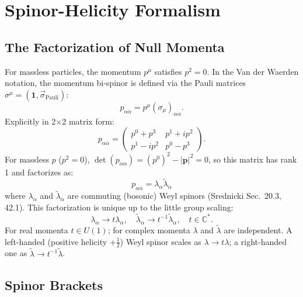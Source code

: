 
\chapter{Spinor-Helicity Formalism}
\label{ch:spinor-helicity}

\section{The Factorization of Null Momenta}

For massless particles, the momentum $p^\mu$ satisfies $p^2 = 0$. In the Van der Waerden notation, the momentum bi-spinor is defined via the Pauli matrices $\sigma^\mu = (\mathbf{1}, \vec{\sigma}_\text{Pauli})$:
\begin{equation}
p_{\alpha\dot{\alpha}} = p^\mu (\sigma_\mu)_{\alpha\dot{\alpha}}.
\end{equation}
Explicitly in 2×2 matrix form:
\begin{equation}
p_{\alpha\dot{\alpha}} = \begin{pmatrix} p^0 + p^3 & p^1 + i p^2 \\ p^1 - i p^2 & p^0 - p^3 \end{pmatrix}.
\end{equation}
For massless $p$ ($p^2 = 0$), $\det(p_{\alpha\dot\alpha}) = (p^0)^2 - |\mathbf{p}|^2 = 0$, so this matrix has rank 1 and factorizes as:
\begin{equation}
p_{\alpha\dot{\alpha}} = \lambda_\alpha \tilde{\lambda}_{\dot{\alpha}}
\end{equation}
where $\lambda_\alpha$ and $\tilde{\lambda}_{\dot{\alpha}}$ are commuting (bosonic) Weyl spinors (Srednicki Sec.\ 20.3, 42.1). This factorization is unique up to the little group scaling:
\begin{equation}
\lambda_\alpha \to t \lambda_\alpha, \quad \tilde{\lambda}_{\dot{\alpha}} \to t^{-1} \tilde{\lambda}_{\dot{\alpha}}, \quad t \in \mathbb{C}^*.
\end{equation}
For real momenta $t \in U(1)$; for complex momenta $\lambda$ and $\tilde\lambda$ are independent. A left-handed (positive helicity $+\tfrac12$) Weyl spinor scales as $\lambda \to t\lambda$; a right-handed one as $\tilde\lambda \to t^{-1}\tilde\lambda$.

\section{Spinor Brackets}

